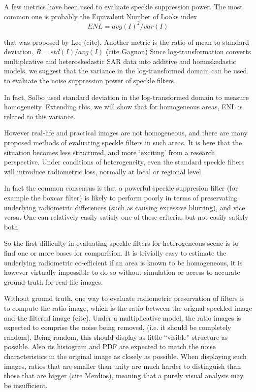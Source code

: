 \documentclass[journal]{IEEEtran}
\begin{document}
A few metrics have been used to evaluate speckle suppression power.
The most common one is probably the Equivalent Number of Looks index 
\begin{equation}
ENL=avg(I)^2/var(I)
\end{equation}

that was proposed by Lee (cite).
Another metric is the ratio of mean to standard deviation, $R=std(I)/avg(I)$ (cite Gagnon)
Since log-transformation converts multiplcative and heteroskedastic SAR data into additive and homoskedastic models, we suggest that the variance in the log-transformed domain can be used to evaluate the noise suppression power of speckle filters.

In fact, Solbo used standard deviation in the log-transformed domain to measure homogeneity. Extending this, we will show that for homogeneous areas, ENL is related to this variance.

However real-life and practical images are not homogeneous, and there are many proposed methods of evaluating speckle filters in such areas. It is here that the situation becomes less structured, and more `exciting' from a research perspective.
Under conditions of heterogeneity, even the standard speckle filters will introduce radiometric loss, normally at local or regional level.

In fact the common consensus is that a powerful speckle suppresion filter (for example the boxcar filter) is likely to perform poorly in terms of preservating underlying radiometric differences (such as causing excessive blurring), and vice versa. One can relatively easily satisfy one of these criteria, but not easily satisfy both.

So the first difficulty in evaluating speckle filters for heterogeneous scene is to find one or more bases for comparision. It is trivially easy to estimate the underlying radiometric co-efficient if an area is known to be homogeneous, it is however virtually impossible to do so without simulation or access to accurate ground-truth for real-life images.

Without ground truth, one way to evaluate radiometric preservation of filters is to compute the ratio image, which is the ratio between the orignal speckled image and the filtered image (cite). Under a multiplicative model, the ratio images is expected to comprise the noise being removed, (i.e. it should be completely random). Being random, this should display as little ``visible'' structure as possible. Also its histogram and PDF are expected to match the noise characteristics in the original image as closely as possible.
When displaying such images, ratios that are smaller than unity are much harder to distinguish than those that are bigger (cite Merdios), meaning that a purely visual analysis may be insufficient.
\end{document}
